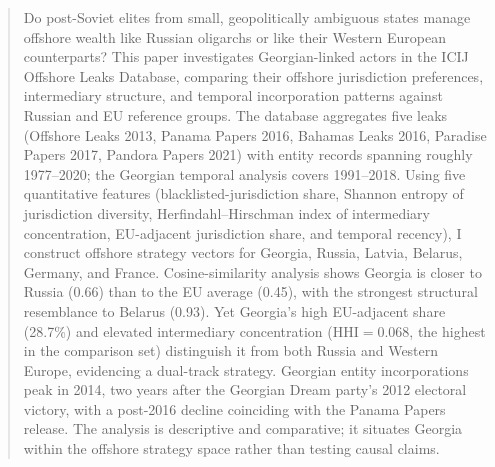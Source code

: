 \documentclass[9pt,twoside]{pnas-new}
\begin{document}
\begin{abstract}
Do post-Soviet elites from small, geopolitically ambiguous states manage offshore wealth like Russian oligarchs or like their Western European counterparts? This paper investigates Georgian-linked actors in the ICIJ Offshore Leaks Database, comparing their offshore jurisdiction preferences, intermediary structure, and temporal incorporation patterns against Russian and EU reference groups. The database aggregates five leaks (Offshore Leaks 2013, Panama Papers 2016, Bahamas Leaks 2016, Paradise Papers 2017, Pandora Papers 2021) with entity records spanning roughly 1977--2020; the Georgian temporal analysis covers 1991--2018. Using five quantitative features (blacklisted-jurisdiction share, Shannon entropy of jurisdiction diversity, Herfindahl--Hirschman index of intermediary concentration, EU-adjacent jurisdiction share, and temporal recency), I construct offshore strategy vectors for Georgia, Russia, Latvia, Belarus, Germany, and France. Cosine-similarity analysis shows Georgia is closer to Russia (0.66) than to the EU average (0.45), with the strongest structural resemblance to Belarus (0.93). Yet Georgia's high EU-adjacent share (28.7\%) and elevated intermediary concentration ($\text{HHI}=0.068$, the highest in the comparison set) distinguish it from both Russia and Western Europe, evidencing a dual-track strategy. Georgian entity incorporations peak in 2014, two years after the Georgian Dream party's 2012 electoral victory, with a post-2016 decline coinciding with the Panama Papers release. The analysis is descriptive and comparative; it situates Georgia within the offshore strategy space rather than testing causal claims.
\end{abstract}


\maketitle
\thispagestyle{firststyle}

\Firstpage
\end{document}
